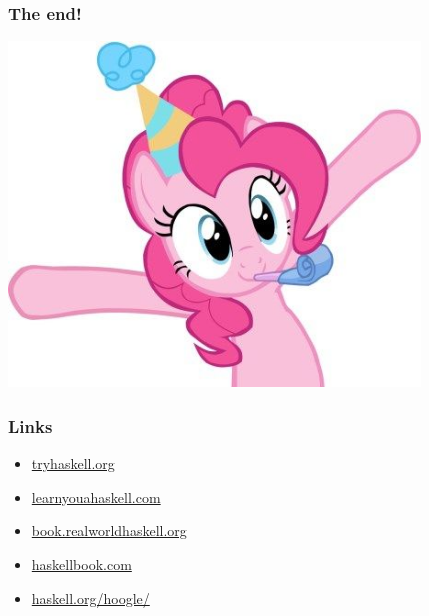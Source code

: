 \documentclass[17pt]{beamer}
\renewcommand{\(}[1]{\begin{columns}[#1]}
\renewcommand{\)}{\end{columns}}
\newcommand{\<}[1]{\begin{column}{#1}}
\renewcommand{\>}{\end{column}}
\begin{document}
\begin{frame}
  \frametitle{The end!}
  \begin{center}
    \includegraphics[width=0.82\textwidth]{img/pinkie-festive}
  \end{center}
\end{frame}

\begin{frame}
  \frametitle{Links}
  \begin{itemize}
  \item \href{https://tryhaskell.org}{tryhaskell.org}
  \item \href{https://learnyouahaskell.com}{learnyouahaskell.com}
  \item \href{https://book.realworldhaskell.org}{book.realworldhaskell.org}
  \item \href{http://haskellbook.com}{haskellbook.com}
  \item \href{https://www.haskell.org/hoogle/}{haskell.org/hoogle/}
  \end{itemize}
\end{frame}



\end{document}
